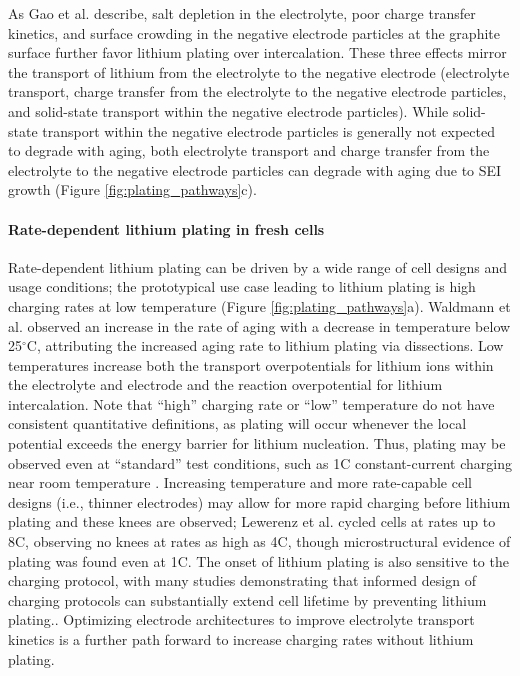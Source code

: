 \documentclass[journal=jpclcd,manuscript=article]{achemso}
\begin{document}
As Gao et al.\cite{gao_interplay_2021} describe, salt depletion in the electrolyte, poor charge transfer kinetics, and surface crowding in the negative electrode particles at the graphite surface further favor lithium plating over intercalation.
These three effects mirror the transport of lithium from the electrolyte to the negative electrode (electrolyte transport, charge transfer from the electrolyte to the negative electrode particles, and solid-state transport within the negative electrode particles).
While solid-state transport within the negative electrode particles is generally not expected to degrade with aging,
both electrolyte transport and charge transfer from the electrolyte to the negative electrode particles can degrade with aging due to SEI growth (Figure \ref{fig:plating_pathways}c).

\paragraph{Rate-dependent lithium plating in fresh cells}
Rate-dependent lithium plating can be driven by a wide range of cell designs and usage conditions; the prototypical use case leading to lithium plating is high charging rates at low temperature \cite{waldmann_temperature_2014, petzl_lithium_2015} (Figure \ref{fig:plating_pathways}a). Waldmann et al.\cite{waldmann_temperature_2014} observed an increase in the rate of aging with a decrease in temperature below 25$^{\circ}$C, attributing the increased aging rate to lithium plating via dissections. Low temperatures increase both the transport overpotentials for lithium ions within the electrolyte and electrode and the reaction overpotential for lithium intercalation. Note that ``high'' charging rate or ``low'' temperature do not have consistent quantitative definitions, as plating will occur whenever the local potential exceeds the energy barrier for lithium nucleation. Thus, plating may be observed even at ``standard'' test conditions, such as 1C constant-current charging near room temperature \cite{waldmann_optimization_2015,burns_-situ_2015}. Increasing temperature and more rate-capable cell designs (i.e., thinner electrodes) may allow for more rapid charging before lithium plating and these knees are observed\cite{yang_understanding_2018, coron_impact_2020}; Lewerenz et al.\cite{lewerenz_systematic_2017} cycled cells at rates up to 8C, observing no knees at rates as high as 4C, though microstructural evidence of plating was found even at 1C. The onset of lithium plating is also sensitive to the charging protocol, with many studies demonstrating that informed design of charging protocols can substantially extend cell lifetime by preventing lithium plating.\cite{waldmann_optimization_2015,schindler_fast_2018, attia_closed-loop_2020}. Optimizing electrode architectures to improve electrolyte transport kinetics is a further path forward to increase charging rates without lithium plating.\cite{nemani_design_2015, usseglio-viretta_enabling_2020}
\end{document}
